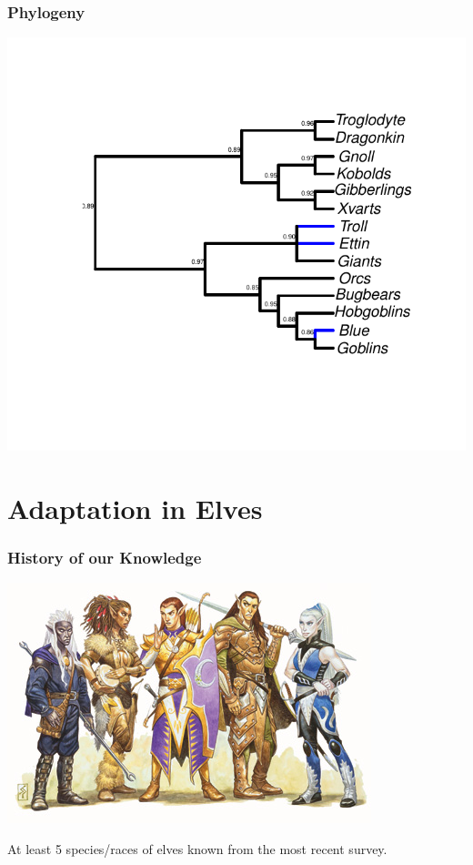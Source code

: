 \documentclass{beamer}\usepackage{graphicx, color}
\makeatletter
\def\maxwidth{ %
  \ifdim\Gin@nat@width>\linewidth
    \linewidth
  \else
    \Gin@nat@width
  \fi
}
\newenvironment{knitrout}{}{} %
\makeatother
\begin{document}
\begin{frame}
  \frametitle{Phylogeny}
\begin{knitrout}\scriptsize
{}\color{fgcolor}\includegraphics[width=\maxwidth]{figure/gob-phy} 
\end{knitrout}

\end{frame}


\section{Adaptation in Elves}
\begin{frame}
  \frametitle{History of our Knowledge}
  \begin{center}
    \includegraphics[height = 0.5\textheight, keepaspectratio = true]{elf_1}
  \end{center}

  At least 5 species/races of elves known from the most recent survey.

\end{frame}
\end{document}
